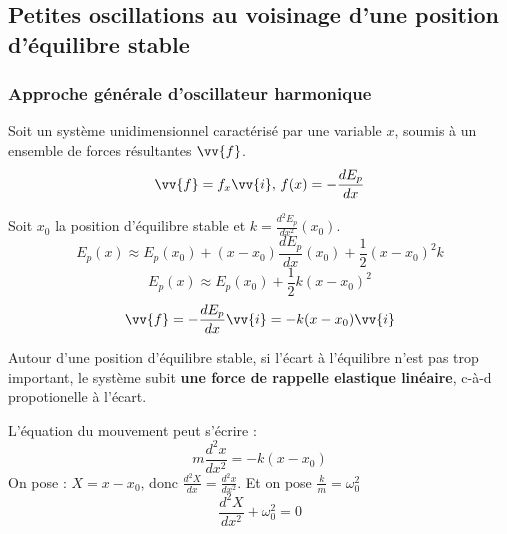 \subsection{Petites oscillations au voisinage d'une position d'équilibre stable}
\subsubsection{Approche générale d'oscillateur harmonique}

Soit un système unidimensionnel caractérisé par une variable \(x\), soumis à un ensemble de forces résultantes \(\vv{f}\). 
\[
    \vv{f} = f_{x}\vv{i} , \, f(x) = -\frac{dE_{p}}{dx}
\] 

Soit \(x_{\text{0}}\) la position d'équilibre stable et \(k = \frac{d^{2}E_{p}}{dx^{2}}(x_{\text{0}})\).
\[
    E_{p}(x) \approx E_{p}(x_{\text{0}}) + (x-x_{\text{0}})\frac{dE_{p}}{dx}(x_{\text{0}}) + \frac{1}{2}(x-x_{\text{0}})^{2}k 
\] 
\[
    E_{p}(x) \approx E_{p}(x_{\text{0}}) + \frac{1}{2}k(x-x_{\text{0}})^{2}
\]
\[
    \vv{f} = -\frac{dE_{p}}{dx} \vv{i} = -k(x-x_{\text{0}})\vv{i}
\]

Autour d'une position d'équilibre stable, si l'écart à l'équilibre n'est pas trop important, le système subit \textbf{une force de rappelle elastique linéaire}, c-à-d propotionelle à l'écart.

L'équation du mouvement peut s'écrire : 
\[
    m \frac{d^{2}x}{dx^{2}} = -k(x-x_{\text{0}})
\]
On pose : \(X = x-x_{\text{0}}\), donc \(\frac{d^{2}X}{dx} = \frac{d^{2}x}{dx^{2}}\). Et on pose \(\frac{k}{m } = \omega_{\text{0}}^{2}\) 
\[
    \frac{d^{2}X}{dx^{2}} + \omega_{\text{0}}^{2}  = 0 
\]

